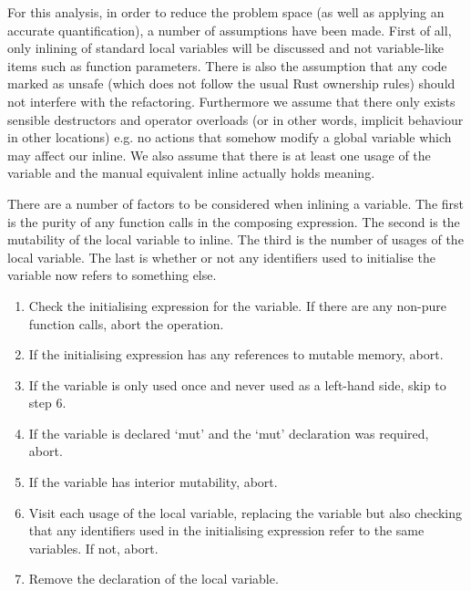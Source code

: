 For this analysis, in order to reduce the problem space (as well as applying an accurate quantification), a number of assumptions have been made. First of all, only inlining of standard local variables will be discussed and not variable-like items such as function parameters. There is also the assumption that any code marked as unsafe (which does not follow the usual Rust ownership rules) should not interfere with the refactoring. Furthermore we assume that there only exists sensible destructors and operator overloads (or in other words, implicit behaviour in other locations) e.g. no actions that somehow modify a global variable which may affect our inline. We also assume that there is at least one usage of the variable and the manual equivalent inline actually holds meaning.

There are a number of factors to be considered when inlining a variable. The first is the purity of any function calls in the composing expression. The second is the mutability of the local variable to inline. The third is the number of usages of the local variable. The last is whether or not any identifiers used to initialise the variable now refers to something else.

\begin{enumerate} 
\item Check the initialising expression for the variable. If there are any non-pure function calls, abort the operation.
\item If the initialising expression has any references to mutable memory, abort.
\item If the variable is only used once and never used as a left-hand side, skip to step 6.
\item If the variable is declared `mut' and the `mut' declaration was required, abort.
\item If the variable has interior mutability, abort.
\item Visit each usage of the local variable, replacing the variable but also checking that any identifiers used in the initialising expression refer to the same variables. If not, abort.
\item Remove the declaration of the local variable.
\end{enumerate}

